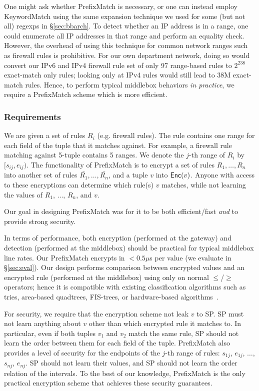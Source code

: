 One might ask whether PrefixMatch is necessary, or one can instead employ KeywordMatch using the same expansion technique we used for some (but not all) regexps in \S\ref{sec:bbarch}. 
To detect whether an IP address is in a range, one could enumerate all IP addresses in that range and perform an equality check. However, the overhead of using this technique for common network ranges such as firewall rules is prohibitive.
For our own department network, doing so would convert our IPv6 and IPv4 firewall rule set of only 97 range-based rules to $2^{238}$ exact-match only rules; looking only at IPv4 rules would still lead to 38M exact-match rules.
Hence, to perform typical middlebox behaviors {\it in practice}, we require a PrefixMatch scheme which is more efficient.

\subsubsection{Requirements}
We are given a set of rules $R_i$ (e.g. firewall rules). The rule contains one range for each field of the tuple that it matches against. For example, a firewall rule matching against 5-tuple contains 5 ranges. We denote the $j$-th range of $R_i$ by $[s_{ij}, e_{ij})$. The functionality of PrefixMatch is to encrypt a set of rules $R_1, \dots, R_n$ into another set of rules $\bar{R_1}, \dots, \bar{R_n}$, and a tuple $v$ into $\mathsf{Enc}(v)$. Anyone with access to these encryptions can determine which rule(s) $v$ matches,  while not learning the values of $R_1$, $\dots$, $R_n$, and $v$. 


Our goal in designing PrefixMatch was for it to be both efficient/fast {\em and} to provide strong security.

In terms of performance, both encryption (performed at the gateway) and detection (performed at the middlebox) should be practical for typical middlebox line rates.
Our PrefixMatch encrypts in $< 0.5\mu$s per value (we evaluate in \S\ref{sec:eval}).
Our design performs comparison between encrypted values and an encrypted rule (performed at the middlebox) using only on normal $\leq$/$\geq$ operators; hence it is compatible with existing classification algorithms such as tries, area-based quadtrees, FIS-trees, or hardware-based algorithms~\cite{packet_classif}.

For security, we require that the encryption scheme not leak $v$ to SP.
SP must not learn anything about $v$ other than which encrypted rule it matches to. 
In particular, even if both tuples $v_1$ and $v_2$ match the same rule, SP should not learn the order between them for each field of the tuple.
PrefixMatch also provides a level of security for the endpoints of the $j$-th range of rules:
 $s_{1j}$, $e_{1j}$, $\dots$, $s_{nj}$, $e_{nj}$. SP should not learn their values, and SP should not learn the order relation of the intervals. To the best of our knowledge, PrefixMatch is the only practical encryption scheme that achieves these security guarantees.

